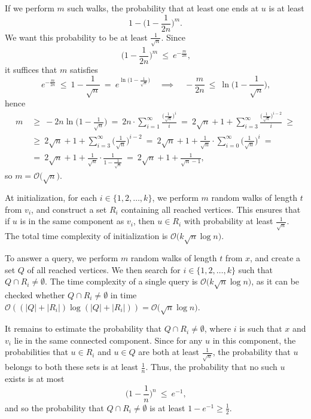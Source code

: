\documentclass[12pt]{article}
\begin{document}
	If we perform \(m\) such walks, the probability that at least one ends at
	\(u\) is at least
	\[
		1 - \bigg( 1 - \frac{1}{2n} \bigg)^{m} \text{.}
	\]
	We want this probability to be at least \(\frac{1}{\sqrt{n}}\). Since
	\[
		\bigg( 1 - \frac{1}{2 n} \bigg)^{m} \ \leqslant \ e^{- \frac{m}{2 n}}
		\text{,}
	\]
	it suffices that \(m\) satisfies
	\[
		e^{- \frac{m}{2 n}} \ \leqslant \ 1 - \frac{1}{\sqrt{n}} \ = \
		e^{\ln \big( 1 - \frac{1}{\sqrt{n}} \big)} \quad \implies \quad -
		\frac{m}{2 n} \ \leqslant \ \ln \bigg( 1 - \frac{1}{\sqrt{n}} \bigg)
		\text{,}
	\]
	hence
	\begin{align*}
		m \ &\geqslant \ - 2 n \ln \bigg( 1 - \frac{1}{\sqrt{n}} \bigg) \ = \ 2
		n \cdot \sum\limits_{i = 1}^{\infty}
		\frac{\Big( \frac{1}{\sqrt{n}} \Big)^{i}}{i} \ = \ 2 \sqrt{n} + 1 +
		\sum\limits_{i = 3}^{\infty}
		\frac{\Big( \frac{1}{\sqrt{n}} \Big)^{i - 2}}{i} \ \geqslant \\
		&\geqslant \ 2 \sqrt{n} + 1 + \sum\limits_{i = 3}^{\infty} \bigg(
		\frac{1}{\sqrt{n}} \bigg)^{i - 2} \ = \ 2 \sqrt{n} + 1 +
		\frac{1}{\sqrt{n}} \cdot \sum\limits_{i = 0}^{\infty} \bigg(
		\frac{1}{\sqrt{n}} \bigg)^{i} \ = \\
		&= \ 2 \sqrt{n} + 1 + \frac{1}{\sqrt{n}} \cdot
		\frac{1}{1 - \frac{1}{\sqrt{n}}} \ = \ 2 \sqrt{n} + 1 +
		\frac{1}{\sqrt{n} - 1} \text{,}
	\end{align*}
	so \(m = \mathcal{O} \big( \sqrt{n} \big)\).
	
	\medskip
	
	At initialization, for each \(i \in \{1, 2, \ldots, k\}\), we perform \(m\)
	random walks of length \(t\) from \(v_{i}\), and construct a set \(R_{i}\)
	containing all reached vertices. This ensures that if \(u\) is in the same
	component as \(v_{i}\), then \(u \in R_{i}\) with probability at least
	\(\frac{1}{\sqrt{n}}\). The total time complexity of initialization is
	\(\mathcal{O} \big( k \sqrt{n} \log n \big)\).
	
	\medskip
	
	To answer a query, we perform \(m\) random walks of length \(t\) from \(x\),
	and create a set \(Q\) of all reached vertices. We then search for \(i \in
	\{1, 2, \ldots, k\}\) such that \(Q \cap R_{i} \neq \emptyset\). The time
	complexity of a single query is \(\mathcal{O} \big( k \sqrt{n} \log n
	\big)\), as it can be checked whether \(Q \cap R_{i} \neq \emptyset\) in
	time \(\mathcal{O} ((|Q| + |R_{i}|) \log (|Q| + |R_{i}|)) = \mathcal{O}
	\big( \sqrt{n} \log n \big)\).
	
	\medskip
	
	It remains to estimate the probability that \(Q \cap R_{i} \neq \emptyset\),
	where \(i\) is such that \(x\) and \(v_{i}\) lie in the same connected
	component. Since for any \(u\) in this component, the probabilities that \(u
	\in R_{i}\) and \(u \in Q\) are both at least \(\frac{1}{\sqrt{n}}\), the
	probability that \(u\) belongs to both these sets is at least
	\(\frac{1}{n}\). Thus, the probability that no such \(u\) exists is at most
	\[
		\bigg( 1 - \frac{1}{n} \bigg)^{n} \ \leqslant \ e^{-1} \text{,}
	\]
	and so the probability that \(Q \cap R_{i} \neq \emptyset\) is at least
	\(1 - e^{-1} \geqslant \frac{1}{2}\).
\end{document}
